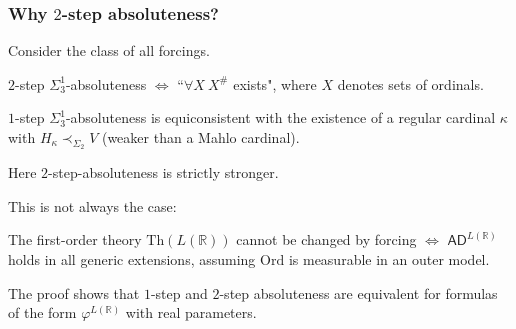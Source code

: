 \documentclass[handout, dvipsnames, usenames, 9pt, serif]{beamer}
\newcommand{\RR}{\mathbb{R}}
\newcommand{\cb}{\color{blue}}
\begin{document}
\begin{frame}
\frametitle{Why $2$-step absoluteness?} 

Consider the class of all forcings. 

\begin{theorem} 
{\cb $2$-step $\Sigma^1_3$-absoluteness} 
$\Longleftrightarrow$ 
{\cb ``$\forall X\ X^\#$ exists"}, where $X$ denotes sets of ordinals. 
\end{theorem} 
\pause 

\begin{theorem} 
{\cb $1$-step $\Sigma^1_3$-absoluteness} is equiconsistent with the existence of a {\cb regular cardinal $\kappa$ with $H_\kappa\prec_{\Sigma_2} V$} (weaker than a Mahlo cardinal). 
\end{theorem} 
\pause 


Here $2$-step-absoluteness is strictly stronger. 
\pause 

\bigskip 
This is not always the case: 

\begin{theorem} 
The first-order theory {\cb $\mathrm{Th}(L(\RR))$ \cb cannot be changed} by forcing $\Longleftrightarrow$ {\cb $\mathsf{AD}^{L(\RR)}$} holds in all generic extensions, assuming $\mathrm{Ord}$ is measurable in an outer model.  
\end{theorem} 

The proof shows that $1$-step and $2$-step absoluteness {\cb are equivalent} for formulas of the form $\varphi^{L(\RR)}$ with real parameters. 

\end{frame}
\end{document}
